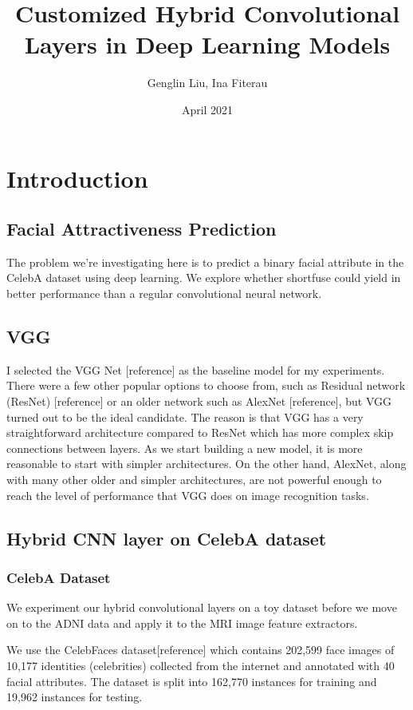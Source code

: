 \documentclass[12pt]{article}
\title{Customized Hybrid Convolutional Layers in Deep Learning Models}
\author{Genglin Liu, Ina Fiterau }
\date{April 2021}
\begin{document}
\maketitle

\section{Introduction}

\subsection{Facial Attractiveness Prediction}
The problem we're investigating here is to predict a binary facial attribute in the CelebA dataset using deep learning. We explore whether shortfuse could yield in better performance than a regular convolutional neural network. 

\subsection{VGG}
I selected the VGG Net [reference] as the baseline model for my experiments. There were a few other popular options to choose from, such as Residual network (ResNet) [reference] or an older network such as AlexNet [reference], but VGG turned out to be the ideal candidate. The reason is that VGG has a very straightforward architecture compared to ResNet which has more complex skip connections between layers. As we start building a new model, it is more reasonable to start with simpler architectures. On the other hand, AlexNet, along with many other older and simpler architectures, are not powerful enough to reach the level of performance that VGG does on image recognition tasks. 

\subsection{Hybrid CNN layer on CelebA dataset}

\subsubsection{CelebA Dataset}

We experiment our hybrid convolutional layers on a toy dataset before we move on to the ADNI data and apply it to the MRI image feature extractors.

We use the CelebFaces dataset[reference] which contains 202,599 face
images of 10,177 identities (celebrities) collected from
the internet and annotated with 40 facial attributes. The dataset is split into 162,770 instances for training and 19,962 instances for testing.
\end{document}
